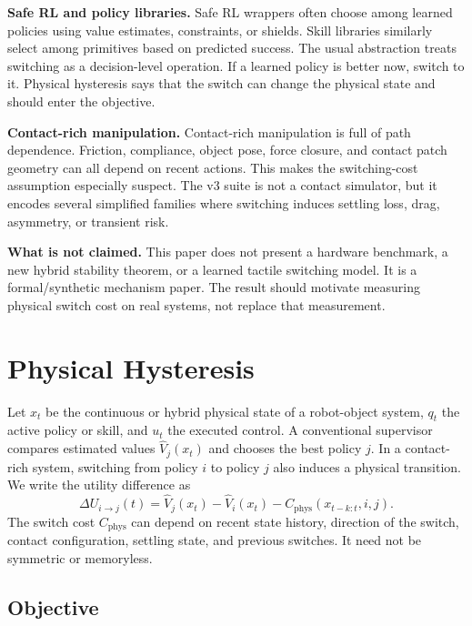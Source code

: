 \documentclass{article}
\newcommand{\phys}{C_{\mathrm{phys}}}
\newcommand{\state}{x}
\newcommand{\mode}{q}
\begin{document}
\textbf{Safe RL and policy libraries.}
Safe RL wrappers often choose among learned policies using value estimates, constraints, or shields.
Skill libraries similarly select among primitives based on predicted success.
The usual abstraction treats switching as a decision-level operation.
If a learned policy is better now, switch to it.
Physical hysteresis says that the switch can change the physical state and should enter the objective.

\textbf{Contact-rich manipulation.}
Contact-rich manipulation is full of path dependence.
Friction, compliance, object pose, force closure, and contact patch geometry can all depend on recent actions.
This makes the switching-cost assumption especially suspect.
The v3 suite is not a contact simulator, but it encodes several simplified families where switching induces settling loss, drag, asymmetry, or transient risk.

\textbf{What is not claimed.}
This paper does not present a hardware benchmark, a new hybrid stability theorem, or a learned tactile switching model.
It is a formal/synthetic mechanism paper.
The result should motivate measuring physical switch cost on real systems, not replace that measurement.

\section{Physical Hysteresis}

Let $\state_t$ be the continuous or hybrid physical state of a robot-object system, $\mode_t$ the active policy or skill, and $u_t$ the executed control.
A conventional supervisor compares estimated values $\widehat{V}_j(\state_t)$ and chooses the best policy $j$.
In a contact-rich system, switching from policy $i$ to policy $j$ also induces a physical transition.
We write the utility difference as
\begin{equation}
    \Delta U_{i\rightarrow j}(t)
    =
    \widehat{V}_j(\state_t)
    -
    \widehat{V}_i(\state_t)
    -
    \phys(\state_{t-k:t}, i, j).
\end{equation}
The switch cost $\phys$ can depend on recent state history, direction of the switch, contact configuration, settling state, and previous switches.
It need not be symmetric or memoryless.

\subsection{Objective}
\end{document}
